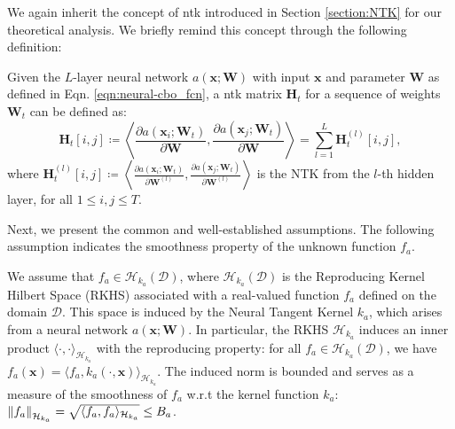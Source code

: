 We again inherit the concept of \acf{ntk} introduced in Section \ref{section:NTK} for our theoretical analysis. We briefly remind this concept through the following definition: 
\begin{definition}
    \label{def:neural-cbo_ntk}
    Given the $L$-layer neural network $a(\mathbf{x}; \mathbf{W})$ with input $\mathbf{x}$ and parameter $\mathbf{W}$ as defined in Eqn. \eqref{eqn:neural-cbo_fcn}, a \ac{ntk} matrix $\mathbf{H}_t$ for a sequence of weights {$\mathbf{W}_t$} can be defined as:
    \begin{equation*}
        \mathbf{H}_t [i, j] \coloneqq \left \langle \frac{\partial a(\mathbf{x}_i; \mathbf{W}_t)}{\partial \mathbf{W}},  \frac{\partial a(\mathbf{x}_j; \mathbf{W}_t)}{\partial \mathbf{W}}\right \rangle = \sum_{l=1}^L \mathbf{H}^{(l)}_t[i, j],
    \end{equation*}
    where $\mathbf{H}^{(l)}_t [i, j] \coloneqq \left \langle \frac{\partial a(\mathbf{x}_i; \mathbf{W}_t)}{\partial \mathbf{W}^{(l)}},  \frac{\partial a(\mathbf{x}_j; \mathbf{W}_t)}{\partial \mathbf{W}^{(l)}}\right \rangle$ is the NTK from the $l$-th hidden layer, for all $1 \le i, j \le T$.
\end{definition}


Next, we present the common and well-established assumptions. The following assumption indicates the smoothness property of the unknown function $f_a$.
\begin{assumption}
\label{assumption:neural-cbo_rkhs}
We assume that $f_a \in \mathcal{H}_{k_a}(\mathcal{D})$, where $\mathcal{H}_{k_a}(\mathcal{D})$ is the Reproducing Kernel Hilbert Space (RKHS) associated with a real-valued function $f_a$ defined on the domain $\mathcal{D}$. This space is induced by the Neural Tangent Kernel $k_a$, which arises from a neural network $a(\mathbf{x}; \mathbf{W})$. In particular, the RKHS $\mathcal{H}_{k_a}$ induces an inner product $\langle \cdot, \cdot \rangle_{\mathcal{H}_{k_a}} $ with the reproducing property: for all $f_a \in \mathcal{H}_{k_a}(\mathcal{D})$, we have 
$f_a(\mathbf{x}) = \langle f_a, k_a(\cdot, \mathbf{x}) \rangle_{\mathcal{H}_{k_a}}$. 
The induced norm is bounded and 
serves as a measure of the smoothness of $f_a$ w.r.t the kernel function $k_a$: $\norm{f_a}_{\mathcal{H}_{k_a}} = \sqrt{\langle f_a, f_a \rangle_{\mathcal{H}_{k_a}}} \leq B_a$. 
\end{assumption}


